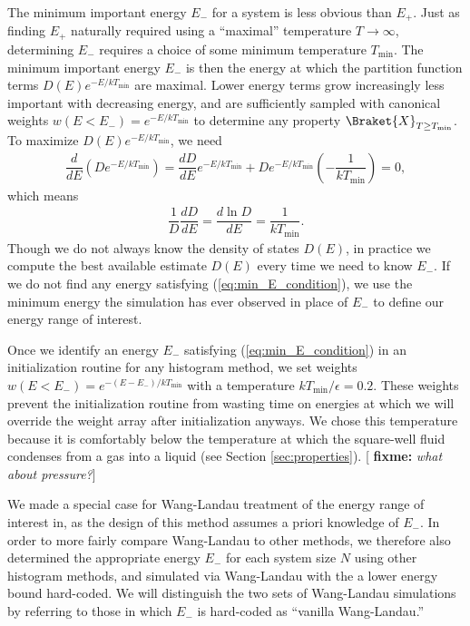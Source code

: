 \documentclass[11pt]{article}
\newcommand{\bk}{\Braket} %
\renewcommand{\t}{\text} %
\newcommand{\f}[2]{\dfrac{#1}{#2}} %
\newcommand{\p}[1]{\left(#1\right)} %
\newcommand{\red}[1]{{\bf \color{red} #1}}
\newcommand{\fixme}[1]{[\red{fixme:} \emph{#1}]}
\begin{document}
The minimum important energy $E_-$ for a system is less obvious than
$E_+$. Just as finding $E_+$ naturally required using a ``maximal''
temperature $T\to\infty$, determining $E_-$ requires a choice of some
minimum temperature $T_{\t{min}}$. The minimum important energy $E_-$
is then the energy at which the partition function terms
$D\p{E}e^{-E/kT_{\t{min}}}$ are maximal. Lower energy terms grow
increasingly less important with decreasing energy, and are
sufficiently sampled with canonical weights
$w\p{E<E_-}=e^{-E/kT_{\t{min}}}$ to determine any property
$\bk{X}_{T\ge T_{\t{min}}}$. To maximize $D\p{E}e^{-E/kT_{\t{min}}}$,
we need
\begin{align}
  \f{d}{dE}\p{De^{-E/kT_{\t{min}}}}
  =\f{dD}{dE}e^{-E/kT_{\t{min}}}+De^{-E/kT_{\t{min}}}\p{-\f{1}{kT_{\t{min}}}}=0,
  \label{eq:min_E_setup}
\end{align}
which means
\begin{align}
  \f1{D}\f{dD}{dE}=\f{d\ln D}{dE}=\f{1}{kT_{\t{min}}}.
  \label{eq:min_E_condition}
\end{align}
Though we do not always know the density of states $D\p{E}$, in
practice we compute the best available estimate $D\p{E}$ every time we
need to know $E_-$. If we do not find any energy satisfying
(\ref{eq:min_E_condition}), we use the minimum energy the simulation
has ever observed in place of $E_-$ to define our energy range of
interest.

Once we identify an energy $E_-$ satisfying (\ref{eq:min_E_condition})
in an initialization routine for any histogram method, we set weights
$w\p{E<E_-}=e^{-\p{E-E_-}/kT_{\t{min}}}$ with a temperature
$kT_{\t{min}}/\epsilon=0.2$. These weights prevent the initialization
routine from wasting time on energies at which we will override the
weight array after initialization anyways. We chose this temperature
because it is comfortably below the temperature at which the
square-well fluid condenses from a gas into a liquid (see Section
\ref{sec:properties}). \fixme{what about pressure?}

We made a special case for Wang-Landau treatment of the energy range
of interest in, as the design of this method assumes a priori
knowledge of $E_-$. In order to more fairly compare Wang-Landau to
other methods, we therefore also determined the appropriate energy
$E_-$ for each system size $N$ using other histogram methods, and
simulated via Wang-Landau with the a lower energy bound hard-coded. We
will distinguish the two sets of Wang-Landau simulations by referring
to those in which $E_-$ is hard-coded as ``vanilla Wang-Landau.''
\end{document}

